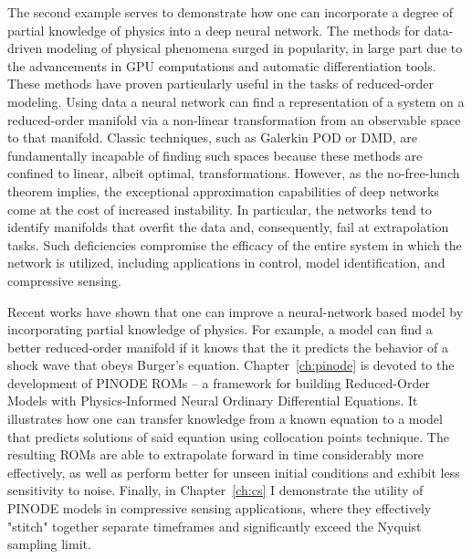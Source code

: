 The second example serves to demonstrate how one can incorporate a degree of partial knowledge of physics into a deep neural network. The methods for data-driven modeling of physical phenomena surged in popularity, in large part due to the advancements in GPU computations and automatic differentiation tools. These methods have proven particularly useful in the tasks of reduced-order modeling.  Using data a neural network can find a representation of a system on a reduced-order manifold via a non-linear transformation from an observable space to that manifold. Classic techniques, such as Galerkin POD or DMD, are fundamentally incapable of finding such spaces because these methods are confined to linear, albeit optimal, transformations. However, as the no-free-lunch theorem implies, the exceptional approximation capabilities of deep networks come at the cost of increased instability. In particular, the networks tend to identify manifolds that overfit the data and, consequently, fail at extrapolation tasks. Such deficiencies compromise the efficacy of the entire system in which the network is utilized, including applications in control, model identification, and compressive sensing.

Recent works have shown that one can improve a neural-network based model by incorporating partial knowledge of physics. For example, a model can find a better reduced-order manifold if it knows that the it predicts the behavior of a shock wave that obeys Burger's equation. Chapter~\ref{ch:pinode} is devoted to the development of PINODE ROMs -- a framework for building Reduced-Order Models with Physics-Informed Neural Ordinary Differential Equations. It illustrates how one can transfer knowledge from a known equation to a model that predicts solutions of said equation using collocation points technique.  The resulting ROMs are able to extrapolate forward in time considerably more effectively, as well as perform better for unseen initial conditions and exhibit less sensitivity to noise. Finally, in Chapter~\ref{ch:cs} I demonstrate the utility of PINODE models in compressive sensing applications, where they effectively "stitch" together separate timeframes and significantly exceed the Nyquist sampling limit.

